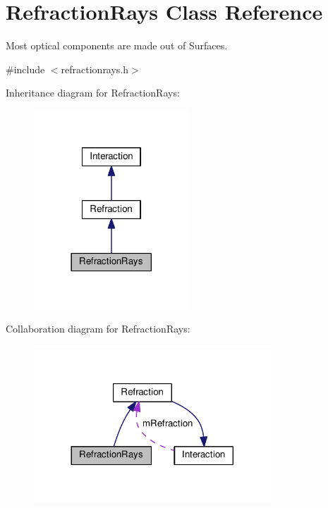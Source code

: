 \hypertarget{classRefractionRays}{}\section{Refraction\+Rays Class Reference}
\label{classRefractionRays}


Most optical components are made out of Surfaces.  




{\ttfamily \#include $<$refractionrays.\+h$>$}



Inheritance diagram for Refraction\+Rays\+:\nopagebreak
\begin{figure}[H]
\begin{center}
\leavevmode
\includegraphics[width=165pt]{classRefractionRays__inherit__graph}
\end{center}
\end{figure}


Collaboration diagram for Refraction\+Rays\+:\nopagebreak
\begin{figure}[H]
\begin{center}
\leavevmode
\includegraphics[width=252pt]{classRefractionRays__coll__graph}
\end{center}
\end{figure}
